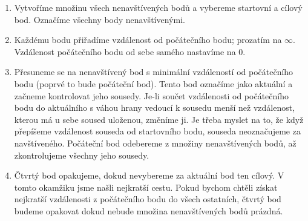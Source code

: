 \begin{enumerate}
  \item Vytvoříme množinu všech nenavštívených bodů a vybereme startovní a cílový bod. Označíme všechny body nenavštívenými.
  \item Každému bodu přiřadíme vzdálenost od počátečního bodu; prozatím na $\infty$. Vzdálenost počátečního bodu od sebe samého nastavíme na $0$.
  \item Přesuneme se na nenavštívený bod s minimální vzdáleností od počátečního bodu (poprvé to bude počáteční bod).
        Tento bod označíme jako aktuální a začneme kontrolovat jeho sousedy.
        Je-li součet vzdálenosti od počátečního bodu do aktuálního s váhou hrany vedoucí k sousedu menší než vzdálenost, kterou má u sebe soused uloženou, změníme ji.
        Je třeba myslet na to, že když přepíšeme vzdálenost souseda od startovního bodu, souseda neoznačujeme za navštíveného. Počáteční bod odebereme z množiny nenavštívených bodů, až zkontrolujeme všechny jeho sousedy.
  \item Čtvrtý bod opakujeme, dokud nevybereme za aktuální bod ten cílový. V tomto okamžiku jsme našli nejkratší cestu. Pokud bychom chtěli získat nejkratší vzdálenosti z počátečního bodu do všech ostatních, čtvrtý bod budeme opakovat dokud nebude množina nenavštívených bodů prázdná.
\end{enumerate}
